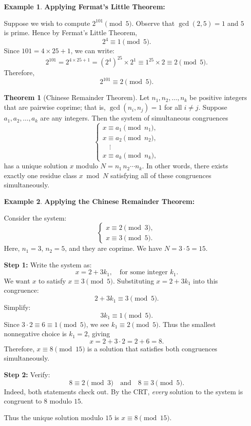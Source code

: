 \documentclass[12pt]{article}
\theoremstyle{definition} %
\newtheorem{theorem}{Theorem}
\newtheorem{example}{Example}
\theoremstyle{plain} %
\begin{document}
  \begin{example}
    \textbf{Applying Fermat's Little Theorem:} 
  
    Suppose we wish to compute $2^{101} \pmod{5}$. Observe that $\gcd(2, 5)=1$ and $5$ is prime. Hence by Fermat's Little Theorem,
    \[
      2^{4} \equiv 1 \pmod{5}.
    \]
    Since $101 = 4 \times 25 + 1$, we can write:
    \[
      2^{101} = 2^{4 \times 25 + 1} = (2^4)^{25} \times 2^1 
               \equiv 1^{25} \times 2 
               \equiv 2 \pmod{5}.
    \]
    Therefore,
    \[
      2^{101} \equiv 2 \pmod{5}.
    \]
  \end{example}

  \begin{theorem}[Chinese Remainder Theorem]
    Let $n_1, n_2, \ldots, n_k$ be positive integers that are pairwise coprime; 
    that is, $\gcd(n_i, n_j) = 1$ for all $i \neq j$. 
    Suppose $a_1, a_2, \ldots, a_k$ are any integers. 
    Then the system of simultaneous congruences
    \[
      \begin{cases}
        x \equiv a_1 \pmod{n_1},\\
        x \equiv a_2 \pmod{n_2},\\
        \quad \vdots \\
        x \equiv a_k \pmod{n_k},
      \end{cases}
    \]
    has a unique solution $x$ modulo $N = n_1\,n_2 \cdots n_k$. 
    In other words, there exists exactly one residue class $x \bmod N$ 
    satisfying all of these congruences simultaneously.
  \end{theorem}
  
  \begin{example}
    \textbf{Applying the Chinese Remainder Theorem:}
  
    Consider the system:
    \[
      \begin{cases}
        x \equiv 2 \pmod{3},\\
        x \equiv 3 \pmod{5}.
      \end{cases}
    \]
    Here, $n_1 = 3$, $n_2 = 5$, and they are coprime. 
    We have $N = 3 \cdot 5 = 15$.
  
    \medskip
    \textbf{Step 1:} Write the system as:
    \[
      x = 2 + 3k_1, \quad\text{for some integer } k_1.
    \]
    We want $x$ to satisfy $x \equiv 3 \pmod{5}$. Substituting $x = 2 + 3k_1$ into this congruence:
    \[
      2 + 3k_1 \equiv 3 \pmod{5}.
    \]
    Simplify:
    \[
      3k_1 \equiv 1 \pmod{5}.
    \]
    Since $3 \cdot 2 \equiv 6 \equiv 1 \pmod{5}$, we see $k_1 \equiv 2 \pmod{5}$. 
    Thus the smallest nonnegative choice is $k_1 = 2$, giving
    \[
      x = 2 + 3 \cdot 2 = 2 + 6 = 8.
    \]
    Therefore, $x \equiv 8 \pmod{15}$ is a solution that satisfies both 
    congruences simultaneously.
  
    \medskip
    \textbf{Step 2:} Verify:
    \[
      8 \equiv 2 \pmod{3} 
      \quad\text{and}\quad
      8 \equiv 3 \pmod{5}.
    \]
    Indeed, both statements check out. By the CRT, \emph{every} solution 
    to the system is congruent to $8$ modulo $15$.
  
    \medskip
    Thus the unique solution modulo $15$ is $\boxed{x \equiv 8 \pmod{15}}$.
  \end{example}
\end{document}

